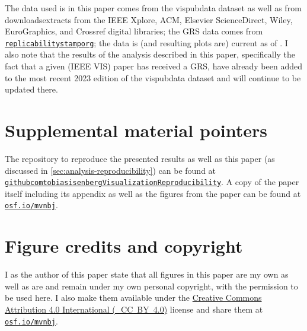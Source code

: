 \documentclass[conference]{vgtc}                     %
\newcommand{\osfid}{mvnbj}
\begin{document}
The data used is in this paper comes from the vispubdata dataset \cite{Isenberg:2017:VMC} as well as from down\-loads\discretionary{/}{}{/}ex\-tracts from the IEEE Xplore, ACM, Elsevier ScienceDirect, Wiley, EuroGraphics, and Crossref digital libraries; the GRS data comes from \href{https://www.replicabilitystamp.org/}{\texttt{replicabilitystamporg}}; the data is (and resulting plots are) current as of \GrsiDataCurrentAsOf{}. I also note that the results of the analysis described in this paper, specifically the fact that a given (IEEE VIS) paper has received a GRS, have already been added to the most recent 2023 edition of the vispubdata dataset \cite{Isenberg:2017:VMC} and will continue to be updated there.

\section*{Supplemental material pointers}
\label{sec:supplemental_materials}

The repository to reproduce the presented results as well as this paper (as discussed in \autoref{sec:analysis-reproducibility}) can be found at \href{https://github.com/tobiasisenberg/Visualization-Reproducibility}{\texttt{githubcom\discretionary{/}{}{/}tobiasisenberg\discretionary{/}{}{/}Visualization\discretionary{}{-}{-}Reproducibility}}. A copy of the paper itself including its appendix as well as the figures from the paper can be found at \href{https://osf.io/\osfid/}{\texttt{osf.io/\osfid}}.

\section*{Figure credits and copyright}
\label{sec:figure_credits}

I as the author of this paper state that all figures in this paper are my own as well as are and remain under my own personal copyright, with the permission to be used here. I also make them available under the \href{https://creativecommons.org/licenses/by/4.0/}{Creative Commons At\-tri\-bu\-tion 4.0 International (\ccLogo\,\ccAttribution\ \mbox{CC BY 4.0})} license and share them at \href{https://osf.io/\osfid/}{\texttt{osf.io/\osfid}}.

\end{document}
